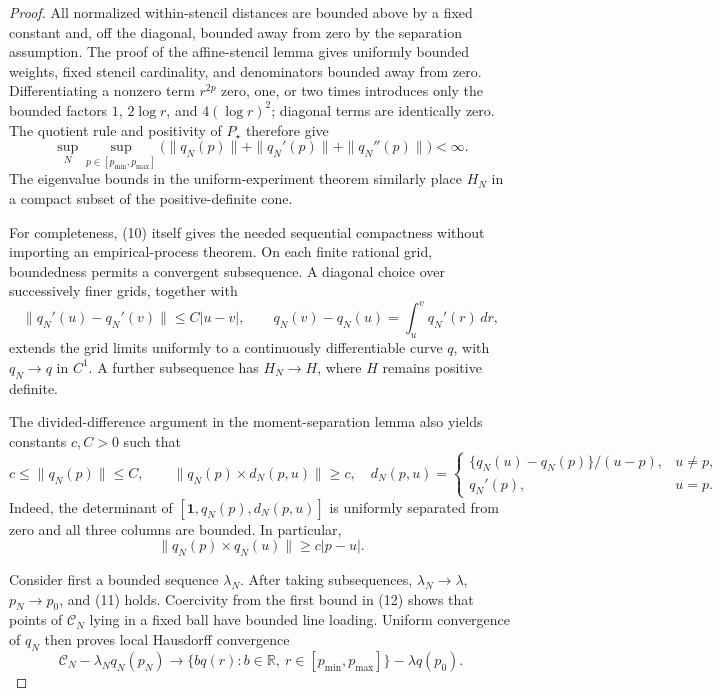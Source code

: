 \documentclass{article}
\begin{document}
\begin{proof}
All normalized within-stencil distances are bounded above by a fixed constant and, off the diagonal, bounded away from zero by the separation assumption.  The proof of the affine-stencil lemma gives uniformly bounded weights, fixed stencil cardinality, and denominators bounded away from zero.  Differentiating a nonzero term \(r^{2p}\) zero, one, or two times introduces only the bounded factors \(1\), \(2\log r\), and \(4(\log r)^2\); diagonal terms are identically zero.  The quotient rule and positivity of \(P_\star\) therefore give
\[
 \sup_N\sup_{p\in[p_{\min},p_{\max}]}
 \bigl(\|q_N(p)\|+\|q_N'(p)\|+\|q_N''(p)\|\bigr)<\infty.                 \tag{10}
\]
The eigenvalue bounds in the uniform-experiment theorem similarly place \(H_N\) in a compact subset of the positive-definite cone.

For completeness, (10) itself gives the needed sequential compactness without importing an empirical-process theorem.  On each finite rational grid, boundedness permits a convergent subsequence.  A diagonal choice over successively finer grids, together with
\[
 \|q_N'(u)-q_N'(v)\|\le C|u-v|,
 \qquad
 q_N(v)-q_N(u)=\int_u^v q_N'(r)\,dr,                                         \tag{11}
\]
extends the grid limits uniformly to a continuously differentiable curve \(q\), with \(q_N\to q\) in \(C^1\).  A further subsequence has \(H_N\to H\), where \(H\) remains positive definite.

The divided-difference argument in the moment-separation lemma also yields constants \(c,C>0\) such that
\[
 c\le \|q_N(p)\|\le C,
 \qquad
 \|q_N(p)\times d_N(p,u)\|\ge c,
 \quad
 d_N(p,u)=
 \begin{cases}
 \{q_N(u)-q_N(p)\}/(u-p),&u\ne p,\\
 q_N'(p),&u=p.
 \end{cases}                                                                 \tag{12}
\]
Indeed, the determinant of \([\mathbf1,q_N(p),d_N(p,u)]\) is uniformly separated from zero and all three columns are bounded.  In particular,
\[
 \|q_N(p)\times q_N(u)\|\ge c|p-u|.                                         \tag{13}
\]

Consider first a bounded sequence \(\lambda_N\).  After taking subsequences, \(\lambda_N\to\lambda\), \(p_N\to p_0\), and (11) holds.  Coercivity from the first bound in (12) shows that points of \(\mathcal C_N\) lying in a fixed ball have bounded line loading.  Uniform convergence of \(q_N\) then proves local Hausdorff convergence
\[
 \mathcal C_N-\lambda_Nq_N(p_N)
 \longrightarrow
 \{bq(r):b\in\mathbb R,\ r\in[p_{\min},p_{\max}]\}
 -\lambda q(p_0).                                                            \tag{14}
\]


\end{proof}
\end{document}
